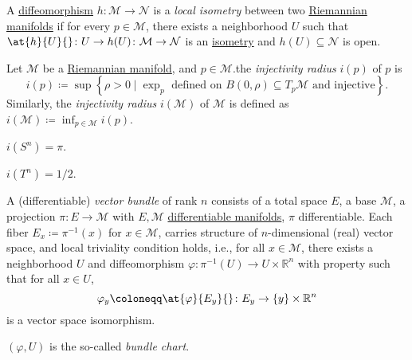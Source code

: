 \begin{definition}\label{def:local-isometry}
	A \hyperref[def:diffeomorphism]{diffeomorphism} \(h\colon \mathcal{M} \to \mathcal{N} \) is a \emph{local isometry} between two \hyperref[def:Riemannian-manifold]{Riemannian manifolds} if for every \(p\in \mathcal{M} \), there exists a neighborhood \(U\) such that \(\at{h}{U}{} \colon U \to  h(U)\colon \mathcal{M} \to \mathcal{N} \) is an \hyperref[def:isometry]{isometry} and \(h(U) \subseteq \mathcal{N} \) is open.
\end{definition}

\begin{definition}\label{def:injectivity-radius}
	Let \(\mathcal{M} \) be a \hyperref[def:Riemannian-manifold]{Riemannian manifold}, and \(p\in \mathcal{M} \).the \emph{injectivity radius} \(i(p)\) of \(p\) is
	\[
		i(p) \coloneqq \sup \left\{ \rho > 0 \mid \exp _p \text{ defined on \(B(0, \rho ) \subseteq T_p \mathcal{M} \) and injective}  \right\}.
	\]
	Similarly, the \emph{injectivity radius} \(i(\mathcal{M} )\) of \(\mathcal{M} \) is defined as \(i(\mathcal{M} )\coloneqq \inf _{p\in \mathcal{M} }i(p)\).
\end{definition}

\begin{eg}[Sphere]
	\(i(S^n) = \pi \).
\end{eg}

\begin{eg}[Torus]
	\(i(T^n) = 1 / 2\).
\end{eg}

\begin{definition}\label{def:vector-bundle}
	A (differentiable) \emph{vector bundle} of rank \(n\) consists of a total space \(E\), a base \(\mathcal{M} \), a projection \(\pi \colon E\to \mathcal{M} \) with \(E, \mathcal{M} \) \hyperref[def:smooth-manifold]{differentiable manifolds}, \(\pi \) differentiable. Each fiber \(E_x\coloneqq \pi ^{-1} (x)\) for \(x\in \mathcal{M} \), carries structure of \(n\)-dimensional (real) vector space, and local triviality condition holds, i.e., for all \(x\in \mathcal{M} \), there exists a neighborhood \(U\) and diffeomorphism \(\varphi \colon \pi ^{-1} (U) \to U\times \mathbb{R} ^n\) with property such that for all \(x\in U\),
	\[
		\varphi _y \coloneqq \at{\varphi }{E_y}{} \colon E_y \to \left\{ y \right\} \times \mathbb{R} ^n
	\]
	is a vector space isomorphism.
\end{definition}

\begin{notation}
	\((\varphi , U)\) is the so-called \emph{bundle chart}.
\end{notation}

